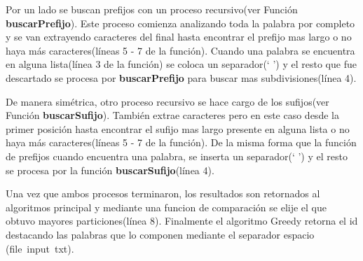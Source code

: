 \documentclass[a4paper,12pt]{report}
\begin{document}
Por un lado se buscan prefijos con un proceso recursivo(ver Función \mbox{\textbf{buscarPrefijo}}). Este proceso comienza analizando toda la palabra por completo y se van extrayendo caracteres del final hasta encontrar el prefijo mas largo o no haya más caracteres(líneas 5 - 7 de la función). %
Cuando una palabra se encuentra en alguna lista(línea 3 de la función) se coloca un separador(` ') y el resto que fue descartado se procesa por \textbf{buscarPrefijo} para buscar mas subdivisiones(línea 4).

De manera simétrica, otro proceso recursivo se hace cargo de los sufijos(ver Función \textbf{buscarSufijo}). También extrae caracteres pero en este caso desde la primer posición hasta encontrar el sufijo mas largo presente en alguna lista o no haya más caracteres(líneas 5 - 7 de la función). %
De la misma forma que la función de prefijos cuando encuentra una palabra, se inserta un separador(` ') y el resto se procesa por la función \textbf{buscarSufijo}(línea 4).

Una vez que ambos procesos terminaron, los resultados son retornados al algoritmos principal y mediante una funcion de comparación se elije el que obtuvo mayores particiones(línea 8). Finalmente el algoritmo Greedy retorna el id destacando las palabras que lo componen mediante el separador espacio \mbox{(\textsf{file input txt})}.

\end{document}
